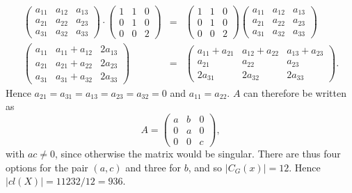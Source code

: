 \documentclass[11pt]{article} \usepackage{amssymb}
\begin{document}
\begin{enumerate}
\begin{enumerate}
\begin{itemize}
        \begin{eqnarray*}
          \begin{pmatrix}
            a_{11}&a_{12}  &a_{13} \\ 
            a_{21}&a_{22}  &a_{23} \\ 
            a_{31}&a_{32}  &a_{33} 
          \end{pmatrix}
          \cdot
          \begin{pmatrix}
            1&1  &0 \\ 
            0&1  &0 \\ 
            0&0  &2 
          \end{pmatrix}
          &=&
          \begin{pmatrix}
            1&1  &0 \\ 
            0&1  &0 \\ 
            0&0  &2 
          \end{pmatrix}
          \begin{pmatrix}
            a_{11}&a_{12}  &a_{13} \\ 
            a_{21}&a_{22}  &a_{23} \\ 
            a_{31}&a_{32}  &a_{33} 
          \end{pmatrix}
          \\
          \begin{pmatrix}
            a_{11}&a_{11}+a_{12}  &2a_{13} \\ 
            a_{21}&a_{21}+a_{22}  &2a_{23} \\ 
            a_{31}&a_{31}+a_{32}  &2a_{33} 
          \end{pmatrix}
          &=&
          \begin{pmatrix}
            a_{11}+a_{21}&a_{12}+a_{22}  &a_{13}+a_{23} \\ 
            a_{21}&a_{22}  &a_{23} \\ 
            2a_{31}&2a_{32}  &2a_{33} 
          \end{pmatrix}.
        \end{eqnarray*}
        Hence $a_{21}=a_{31}=a_{13}=a_{23}=a_{32}=0$ and $a_{11}=a_{22}$. 
        $A$ can therefore be written as
        \begin{equation*}
          A=
          \begin{pmatrix}
            a &b  &0 \\ 
            0 &a  &0 \\ 
            0 &0  &c 
          \end{pmatrix},
        \end{equation*}
        with $ac\neq 0$, since otherwise the matrix would be singular. There are
        thus four options for the pair $(a,c)$ and three for $b$, and so
        $|C_G(x)|=12$. Hence $|cl(X)|=11232/12=936$. 
        

\end{itemize}
\end{enumerate}
\end{enumerate}
\end{document}
